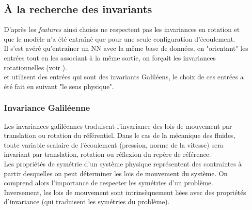\documentclass[a4paper,12pt]{report}
\numberwithin{equation}{section} %
\begin{document}
\subsection*{À la recherche des invariants}
\noindent D'après \citep{ling2016machine} les \textit{features} ainsi choisis ne respectent pas les invariances en rotation et que le modèle n'a été entraîné que pour une seule configuration d'écoulement.\\
Il s'est avéré qu'entraîner un NN avec la même base de données, en "orientant" les entrées tout en les associant à la même sortie, on forçait les invariances rotationnelles (voir \cite{LEFIK20033265}).\\

\noindent \cite{tracey2013application} et \cite{ling2015evaluation} utilisent des entrées qui sont des invariants Galiléens, le choix de ces entrées a été fait en suivant "le sens physique".

\subsubsection{Invariance Galiléenne}
\noindent Les invariances galiléennes traduisent l'invariance des lois de mouvement par translation ou rotation du référentiel. Dans le cas de la mécanique des fluides, toute variable scalaire de l'écoulement (pression, norme de la vitesse) sera invariant par translation, rotation ou réflexion du repère de référence.\\

\noindent Les propriétés de symétrie d'un système physique représentent des contraintes à partir desquelles on peut déterminer les lois de mouvement du système. On comprend alors l'importance de respecter les symétries d'un problème. Inversement, les lois de mouvement sont intrinsèquement liées avec des propriétés d'invariance (qui traduisent les symétries du problème).\\
\end{document}
